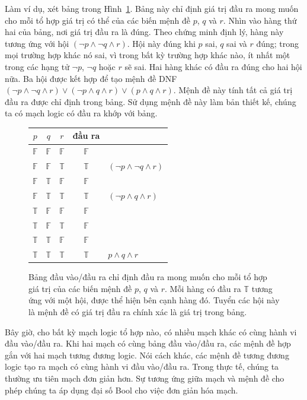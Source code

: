 Làm ví dụ, xét bảng trong Hình~\ref{fig:dnf_table}. Bảng này chỉ định giá trị đầu ra mong muốn cho mỗi tổ hợp giá trị có thể của các biến mệnh đề $p$, $q$ và $r$. Nhìn vào hàng thứ hai của bảng, nơi giá trị đầu ra là đúng. Theo chứng minh định lý, hàng này tương ứng với hội $(\lnot p \land \lnot q \land r)$. Hội này đúng khi $p$ sai, $q$ sai và $r$ đúng; trong mọi trường hợp khác nó sai, vì trong bất kỳ trường hợp khác nào, ít nhất một trong các hạng tử $\lnot p$, $\lnot q$ hoặc $r$ sẽ sai. Hai hàng khác có đầu ra đúng cho hai hội nữa. Ba hội được kết hợp để tạo mệnh đề DNF $(\lnot p \land \lnot q \land r) \lor (\lnot p \land q \land r) \lor (p \land q \land r)$. Mệnh đề này tính tất cả giá trị đầu ra được chỉ định trong bảng. Sử dụng mệnh đề này làm bản thiết kế, chúng ta có mạch logic có đầu ra khớp với bảng.

\begin{figure}[h]
\centering
\begin{tabular}{ccc|c|l}
\hline
$p$ & $q$ & $r$ & đầu ra & \\
\hline
$\mathbb{F}$ & $\mathbb{F}$ & $\mathbb{F}$ & $\mathbb{F}$ & \\
$\mathbb{F}$ & $\mathbb{F}$ & $\mathbb{T}$ & $\mathbb{T}$ & $(\lnot p \land \lnot q \land r)$ \\
$\mathbb{F}$ & $\mathbb{T}$ & $\mathbb{F}$ & $\mathbb{F}$ & \\
$\mathbb{F}$ & $\mathbb{T}$ & $\mathbb{T}$ & $\mathbb{T}$ & $(\lnot p \land q \land r)$ \\
$\mathbb{T}$ & $\mathbb{F}$ & $\mathbb{F}$ & $\mathbb{F}$ & \\
$\mathbb{T}$ & $\mathbb{F}$ & $\mathbb{T}$ & $\mathbb{F}$ & \\
$\mathbb{T}$ & $\mathbb{T}$ & $\mathbb{F}$ & $\mathbb{F}$ & \\
$\mathbb{T}$ & $\mathbb{T}$ & $\mathbb{T}$ & $\mathbb{T}$ & $p \land q \land r$ \\
\hline
\end{tabular}
\caption{Bảng đầu vào/đầu ra chỉ định đầu ra mong muốn cho mỗi tổ hợp giá trị của các biến mệnh đề $p$, $q$ và $r$. Mỗi hàng có đầu ra $\mathbb{T}$ tương ứng với một hội, được thể hiện bên cạnh hàng đó. Tuyển các hội này là mệnh đề có giá trị đầu ra chính xác là giá trị trong bảng.}
\label{fig:dnf_table}
\end{figure}

Bây giờ, cho bất kỳ mạch logic tổ hợp nào, có nhiều mạch khác có cùng hành vi đầu vào/đầu ra. Khi hai mạch có cùng bảng đầu vào/đầu ra, các mệnh đề hợp gắn với hai mạch tương đương logic. Nói cách khác, các mệnh đề tương đương logic tạo ra mạch có cùng hành vi đầu vào/đầu ra. Trong thực tế, chúng ta thường ưu tiên mạch đơn giản hơn. Sự tương ứng giữa mạch và mệnh đề cho phép chúng ta áp dụng đại số Bool cho việc đơn giản hóa mạch.

